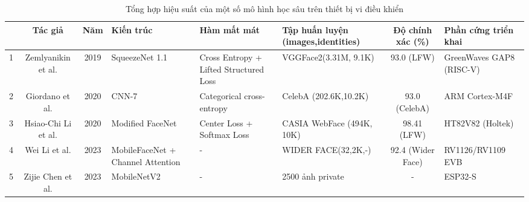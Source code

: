 \begin{table}

    \centering
    \begin{tabular}{|c|c|c|p{3cm}|p{3cm}|p{3.5cm}|c|p{3cm}|}
        \hline &\textbf{Tác giả} & \textbf{Năm} & \textbf{Kiến trúc} & \textbf{Hàm mất mát} & \textbf{Tập huấn luyện (images,identities)} & \textbf{Độ chính xác (\%)} & \textbf{Phần cứng triển khai} \\
        \hline 
        
        1& Zemlyanikin et al. \cite{38_Zemlyanikin_2019_ICCV}& 2019 & SqueezeNet 1.1 & Cross Entropy + Lifted Structured Loss & VGGFace2(3.31M, 9.1K)\cite{cao_2018_vggface2} & 93.0 (LFW) & GreenWaves GAP8 (RISC-V)\cite{greenwavestechnologies_2019_gap8}  \\ 
         2 & Giordano et al. \cite{32_10.1145/3417308.3430273}& 2020 & CNN-7 & Categorical cross-entropy & CelebA (202.6K,10.2K)\cite{liu2015faceattributes} & 93.0 (CelebA)& ARM Cortex-M4F\cite{ambiqmicroinc_2024_apollo3} \\
         3& Hsiao-Chi Li et al. \cite{37_s20216114} & 2020 & Modified FaceNet & Center Loss + Softmax Loss &  CASIA WebFace (494K, 10K)  & 98.41 (LFW)& HT82V82 (Holtek)\cite{holtek_2017_holtek}\\ 
        4 & Wei Li et al. \cite{17_10128985} & 2023  & MobileFaceNet + Channel Attention & - & WIDER FACE(32,2K,-)\cite{yang2016wider} & 92.4 (Wider Face)& RV1126/RV1109 EVB\cite{fuzhourockchipelectronicscoltd_2020_rockchip} \\
        5 & Zijie Chen et al. \cite{35_10457480} & 2023 & MobileNetV2  & - & 2500 ảnh private & -  & ESP32-S \\ 

       \hline
    \end{tabular}
     \caption{Tổng hợp hiệu suất của một số mô hình học sâu trên thiết bị vi điều khiển }
    \label{tab:tinycnn_table}
\end{table}